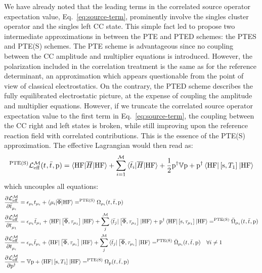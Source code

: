 We have already noted that the leading terms in the correlated source operator expectation
value, Eq.~\eqref{eq:source-term}, prominently involve the singles
cluster operator and the singles left \acs{CC} state.
This simple fact led \citeauthor{Caricato2011-tx} to propose two
intermediate approximations in between the \acs{PTE} and \acs{PTED}
schemes: the \acs{PTES} and \acs{PTE(S)} schemes.
The \acs{PTE} scheme is advantageous since no coupling between the
\acs{CC} amplitude and multiplier equations is introduced. However, the
polarization included in the correlation treatment is the same as for
the reference determinant, an approximation which appears questionable
from the point of view of classical electrostatics. On the contrary, the
\acs{PTED} scheme describes the fully equilibrated electrostatic
picture, at the expense of coupling the amplitude and multiplier
equations.
However, if we truncate the correlated source operator expectation value
to the first term in Eq.~\eqref{eq:source-term}, the coupling between
the \acs{CC} right and left states is broken, while still improving upon the
reference reaction field with correlated contributions.
This is the essence of the \acs{PTE(S)} approximation. The effective
Lagrangian would then read as:
\begin{equation}\label{eq:ptes-cc}
  ^{\mathrm{PTE(S)}}\mathcal{L}^\mathcal{M}_\mathrm{eff}(t_{}, \bar{t}_{}, \mathrm{p}) =
  \braket{\mathrm{HF} | \overline{H} | \mathrm{HF}}
  + \sum_{i=1}^{\mathcal{M}}\braket{\bar{t}_{i} | \overline{H} | \mathrm{HF}}
  + \frac{1}{2}\mathrm{p}^\dagger\mathbb{V}\mathrm{p} + \mathrm{p}^\dagger
  \braket{\mathrm{HF} | \left[ \mathrm{s}, T_1 \right]^{} | \mathrm{HF}}
\end{equation}
which uncouples all equations:
\begin{equation}
  \begin{aligned}
   \frac{\partial^{}\mathcal{L}^\mathcal{M}_\mathrm{eff}} {\partial \bar{t}_{\mu_i}^{}} &=
   \epsilon_{\mu_i}t_{\mu_i} + \braket{\mu_i | \overline{\Phi} | \mathrm{HF}}
   =
   ^{\mathrm{PTE(S)}}\Omega_{\mu_i}(t_{}, \bar{t}_{}, \mathrm{p}) \\
    \frac{\partial^{}\mathcal{L}^\mathcal{M}_\mathrm{eff}} {\partial t_{\mu_1}^{}} &=
    \epsilon_{\mu_1}\bar{t}_{\mu_1} +
    \braket{\mathrm{HF} | \left[ \overline{\Phi}, \tau_{\mu_1} \right]^{} | \mathrm{HF}} +
    \sum_{j}^{\mathcal{M}}\braket{\bar{t}_{j} |
    \left[ \overline{\Phi}, \tau_{\mu_1} \right]^{} | \mathrm{HF}}
    + \mathrm{p}^\dagger
    \braket{\mathrm{HF} | \left[ \mathrm{s}, \tau_{\mu_1} \right]^{} | \mathrm{HF}}
    =
    ^{\mathrm{PTE(S)}}\bar{\Omega}_{\mu_1}(t_{}, \bar{t}_{}, \mathrm{p}) \\
    \frac{\partial^{}\mathcal{L}^\mathcal{M}_\mathrm{eff}} {\partial t_{\mu_i}^{}} &=
    \epsilon_{\mu_i}\bar{t}_{\mu_i} +
    \braket{\mathrm{HF} | \left[ \overline{\Phi}, \tau_{\mu_i} \right]^{} | \mathrm{HF}} +
    \sum_{j}^{\mathcal{M}}\braket{\bar{t}_{j} |
    \left[ \overline{\Phi}, \tau_{\mu_i} \right]^{} | \mathrm{HF}}
    =
    ^{\mathrm{PTE(S)}}\bar{\Omega}_{\mu_i}(t_{}, \bar{t}_{}, \mathrm{p}) \quad \forall i \neq 1 \\
    \frac{\partial^{}\mathcal{L}^\mathcal{M}_\mathrm{eff}} {\partial {\mathrm{p}^{\dagger}}^{}} &=
    \mathbb{V}\mathrm{p} + \braket{\mathrm{HF} | \left[ \mathrm{s}, T_1 \right]^{} | \mathrm{HF}} =
    ^{\mathrm{PTE(S)}}\Omega_{\mathrm{p}}(t_{}, \bar{t}_{}, \mathrm{p})
  \end{aligned}
\end{equation}
